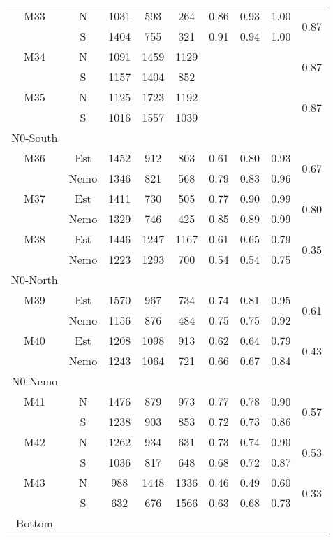 \begin{longtable}{c c c c c c c c c}
  \midrule
  M33 & N & 1031 & 593 & 264 & 0.86 & 0.93 & 1.00 & \multirow{2}{*}{0.87} \\
      & S & 1404 & 755 & 321 & 0.91 & 0.94 & 1.00 & \\
  M34 & N & 1091 & 1459 & 1129 &  &  &  & \multirow{2}{*}{0.87} \\
      & S & 1157 & 1404 & 852 &  &  &  & \\
  M35 & N & 1125 & 1723 & 1192 &  &  &  & \multirow{2}{*}{0.87} \\
      & S & 1016 & 1557 & 1039 &  &  &  & \\
  \midrule
  N0-South\\
  \midrule
  M36 & Est & 1452 & 912 & 803 & 0.61 & 0.80 & 0.93 & \multirow{2}{*}{0.67} \\
      & Nemo & 1346 & 821 & 568 & 0.79 & 0.83 & 0.96 &\\
  M37 & Est & 1411 & 730 & 505 & 0.77 & 0.90 & 0.99 & \multirow{2}{*}{0.80} \\
      & Nemo & 1329 & 746 & 425 & 0.85 & 0.89 & 0.99 & \\
  M38 & Est & 1446 & 1247 & 1167 & 0.61 & 0.65 & 0.79 & \multirow{2}{*}{0.35} \\
      & Nemo & 1223 & 1293 & 700 & 0.54 & 0.54 & 0.75 & \\
  \midrule
  N0-North\\
  \midrule
  M39 & Est & 1570 & 967 & 734 & 0.74 & 0.81 & 0.95 & \multirow{2}{*}{0.61} \\
      & Nemo & 1156 & 876 & 484 & 0.75 & 0.75 & 0.92 & \\
  M40 & Est & 1208 & 1098 & 913 & 0.62 & 0.64 & 0.79 & \multirow{2}{*}{0.43} \\
      & Nemo & 1243 & 1064 & 721 & 0.66 & 0.67 & 0.84 &\\
  \midrule
  N0-Nemo\\
  \midrule
  M41 & N & 1476 & 879 & 973 & 0.77 & 0.78 & 0.90 & \multirow{2}{*}{0.57} \\
      & S & 1238 & 903 & 853 & 0.72 & 0.73 & 0.86 & \\
  M42 & N & 1262 & 934 & 631 & 0.73 & 0.74 & 0.90 & \multirow{2}{*}{0.53} \\
      & S & 1036 & 817 & 648 & 0.68 & 0.72 & 0.87 & \\
  M43 & N & 988 & 1448 & 1336 & 0.46 & 0.49 & 0.60 & \multirow{2}{*}{0.33} \\
      & S & 632 & 676 & 1566 & 0.63 & 0.68 & 0.73 & \\
  \midrule
  Bottom\\

\end{longtable}

